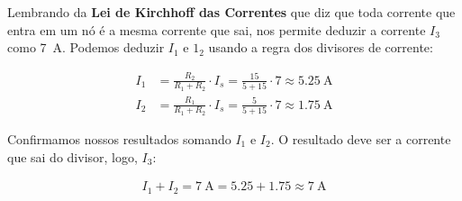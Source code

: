 \documentclass{article}
\begin{document}
Lembrando da \textbf{Lei de Kirchhoff das Correntes} que diz que toda corrente que entra em um nó é a mesma corrente que sai, nos permite deduzir a corrente $I_3$ como \SI{7}{\ampere}. Podemos deduzir $I_1$ e $1_2$ usando a regra dos divisores de corrente:

\begin{equation}
	\begin{aligned}
		I_1 &= \frac{R_2}{R_1 + R_2} \cdot I_s = \frac{15}{5 + 15} \cdot 7 \approx \SI{5.25}{\ampere} \\
		I_2 &= \frac{R_1}{R_1 + R_2} \cdot I_s = \frac{5}{5 + 15} \cdot 7 \approx \SI{1.75}{\ampere}
	\end{aligned}
\end{equation}

Confirmamos nossos resultados somando $I_1$ e $I_2$. O resultado deve ser a corrente que sai do divisor, logo, $I_3$:

\begin{equation}
	\begin{aligned}
		I_1 + I_2 = \SI{7}{\ampere} = 5.25 + 1.75 \approx \SI{7}{\ampere} 
	\end{aligned}
\end{equation} 
\end{document}

